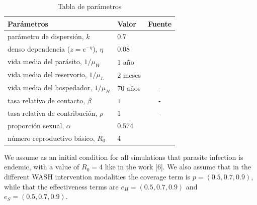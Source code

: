 \documentclass[12pt,a4paper]{article}
\theoremstyle{plain}%
\theoremstyle{definition}
\theoremstyle{remark}
\begin{document}
	\begin{table}[h]
		\centering	
		\begin{tabular}{llc} 	
			Parámetros&Valor & Fuente\\
			\hline 
			parámetro de dispersión, $k$ & 0.7 & \cite{elkins1986epidemiology}\cite{hall1999distribution}\\ 
			denso dependencia ($z = e^{-\eta}$), $\eta$ & 0.08 & \cite{holland1989epidemiology}\\ 
			vida media del parásito, $1/\mu_W$ & $1$ año & \cite{croll1982population}\\
			vida media del reservorio, $1/\mu_L$ & $2$ meses & \cite{larsen1999seasonal}\\
			vida media del hospedador, $1/\mu_H$ & $70$ años & - \\
			tasa relativa de contacto, $\beta$ & $1$ & - \\
			tasa relativa de contribución, $\rho$ & $1$ & -\\
			proporción sexual, $\alpha$ & 0.574 & \cite{seo1979egg}\\
			número reproductivo básico, $R_0$ & 4& \cite{croll1982population}
		\end{tabular}
		\caption{Tabla de parámetros}
		\label{table:parametros}
	\end{table}
	
	We assume as an initial condition for all simulations that parasite infection is endemic, with a value of $R_0 =4$ like in the work [6].
	We also assume that in the different WASH intervention modalities the coverage term is $p=(0.5,0.7,0.9)$, while that the effectiveness terms are $e_H = (0.5, 0.7, 0.9)$ and $e_S = (0.5, 0.7, 0.9)$.
	
	
\end{document}
